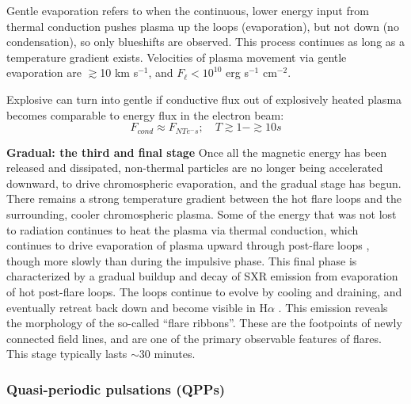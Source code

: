 Gentle evaporation refers to
when the continuous, lower energy input from thermal conduction
pushes plasma up the loops (evaporation), but not down (no condensation),
so only blueshifts are observed.
This process continues as long as a temperature gradient exists.
Velocities of plasma movement via gentle evaporation are
$\gtrsim$10 km s$^{-1}$, and $F_{\ell} < 10^{10}$ erg s$^{-1}$ cm$^{-2}$.

Explosive can turn into gentle if conductive flux out of explosively heated
plasma becomes comparable to energy flux in the electron beam:
\[
    F_{cond} \approx F_{NTe^{-}s}; \quad T \gtrsim 1 - \gtrsim 10s
\]



\textbf{Gradual: the third and final stage}\quad
Once all the magnetic energy has been released and dissipated,
non-thermal particles are no longer being accelerated downward,
to drive chromospheric evaporation, and
the gradual stage has begun.
There remains a strong temperature gradient between the hot flare loops and
the surrounding, cooler chromospheric plasma.
Some of the energy that
was not lost to radiation continues to heat the plasma via thermal
conduction, which continues to drive evaporation of plasma upward
through post-flare loops \citep{Battaglia2015}, though more slowly
than during the impulsive phase. This final phase is characterized by
a gradual buildup and decay of SXR emission from evaporation of hot
post-flare loops. The loops continue to evolve by cooling and
draining, and eventually retreat back down and become visible in
H$\alpha$ \citep{Hudson2007}. This emission reveals the morphology of
the so-called ``flare ribbons''. These are the footpoints of newly
connected field lines, and are one of the primary observable features
of flares. This stage typically lasts $\sim$30 minutes.

\subsubsection{Quasi-periodic pulsations (QPPs)}


